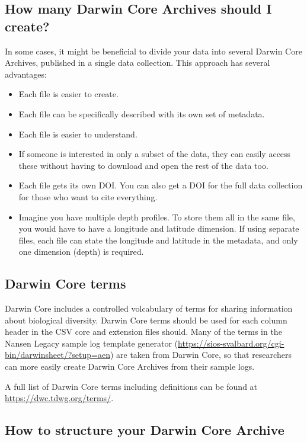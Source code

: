 \documentclass[a4paper,english, 11pt]{article}
\begin{document}
\subsection{How many Darwin Core Archives should I create?}\label{ss:dwcacollection}

In some cases, it might be beneficial to divide your data into several Darwin Core Archives, published in a single data collection. This approach has several advantages:

\begin{itemize}
\item Each file is easier to create.
\item Each file can be specifically described with its own set of metadata.
\item Each file is easier to understand.
\item If someone is interested in only a subset of the data, they can easily access these without having to download and open the rest of the data too.
\item Each file gets its own DOI. You can also get a DOI for the full data collection for those who want to cite everything.
\item Imagine you have multiple depth profiles. To store them all in the same file, you would have to have a longitude and latitude dimension. If using separate files, each file can state the longitude and latitude in the metadata, and only one dimension (depth) is required.
\end{itemize}   

\subsection{Darwin Core terms}
\label{ss:dwcterms}

Darwin Core includes a controlled volcabulary of terms for sharing information about biological diversity. Darwin Core terms should be used for each column header in the CSV core and extension files should. Many of the terms in the Nansen Legacy sample log template generator (\url{https://sios-svalbard.org/cgi-bin/darwinsheet/?setup=aen}) are taken from Darwin Core, so that researchers can more easily create Darwin Core Archives from their sample logs.

A full list of Darwin Core terms including definitions can be found at \url{https://dwc.tdwg.org/terms/}.

\subsection{How to structure your Darwin Core Archive}
\label{ss:structuredwca}
\end{document}
